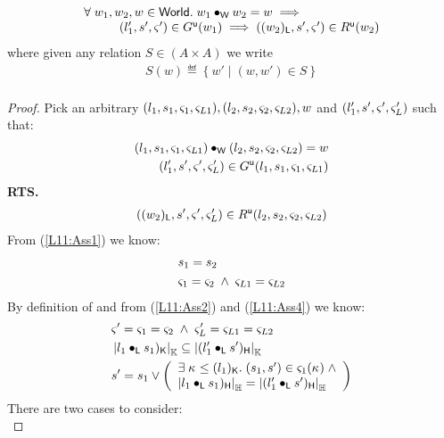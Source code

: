 \begin{lemma}[] \label{lem:updateGContainment}
%
\[
\begin{array}{l}
	\forall\; w_1, w_2, w \in \textsf{World}.\; w_1 \bullet_{\textsf{W}} w_2 = w \implies\\
	\hspace*{1cm}(l'_1, s', \varsigma_{}') \in G^{\textsf{u}}(w_1) \implies ((w_2)_{\textsf{L}}, s', \varsigma_{}') \in R^{\textsf{u}}(w_2)
\end{array}
\]
%
where given any relation $S \in (A \times A)$ we write
%
\[
\begin{array}{l}
	S(w) \eqdef \left\{w' \;|\; (w, w') \in S \right\}\\
\end{array}
\]
%
\begin{proof} Pick an arbitrary $(l_1, s_1, \varsigma_{1}, \varsigma_{L1}), (l_2, s_2, \varsigma_{2}, \varsigma_{L2}), w$ and $(l'_1, s', \varsigma_{}', \varsigma_{L}')$ such that:
%
\begin{align}
	(l_1, s_1, \varsigma_{1}, \varsigma_{L1}) \bullet_{\textsf{W}} (l_2, s_2, \varsigma_{2}, \varsigma_{L2}) = w \label{L11:Ass1}\\
	(l'_1, s', \varsigma_{}', \varsigma_{L}') \in G^{\textsf{u}}(l_1, s_1, \varsigma_{1}, \varsigma_{L1}) \label{L11:Ass2}
\end{align}
%
\textbf{RTS.}
%
\begin{align}
	((w_2)_{\textsf{L}}, s', \varsigma_{}', \varsigma_{L}') \in R^{\textsf{u}}(l_2, s_2, \varsigma_{2}, \varsigma_{L2}) \label{L11:Goal}
\end{align}
From (\ref{L11:Ass1}) we know:
%
\begin{align}
	&s_1 = s_2 \label{L11:Ass3}\\
	&\varsigma_{1} = \varsigma_{2} \;\land\; \varsigma_{L1} = \varsigma_{L2} \label{L11:Ass4}
\end{align}
%
By definition of \updateG and from (\ref{L11:Ass2}) and (\ref{L11:Ass4}) we know:
%
\begin{align}
	& \varsigma_{}' = \varsigma_{1} = \varsigma_{2} \;\land\; \varsigma_{L}' = \varsigma_{L1} = \varsigma_{L2} \label{L11:Ass5} \\
	& \left\lvert l_1 \bullet_{\textsf{L}} s_1)_{\textsf{K}}\right\rvert_{\mathbb{K}} \subseteq \left\lvert (l'_1 \bullet_{\textsf{L}} s')_{\textsf{H}}\right\rvert_{\mathbb{K}} \label{L11:Perms} \\
	& s' = s_1 \lor 
	\left(\begin{array}{l}
		\exists\; \kappa_{} \leq (l_1)_{\textsf{K}}.\;  (s_1, s') \in \varsigma_{1}(\kappa_{}) \;\land \\
		\left\lvert l_1 \bullet_{\textsf{L}} s_1)_{\textsf{H}}\right\rvert_{\mathbb{H}} = \left\lvert (l'_1 \bullet_{\textsf{L}} s')_{\textsf{H}}\right\rvert_{\mathbb{H}}
	\end{array} \right) \nonumber
\end{align}
%
There are two cases to consider:\\


\end{proof}
\end{lemma}
